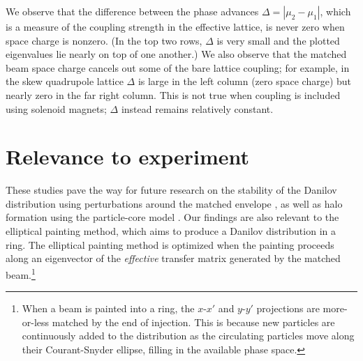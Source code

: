 %
We observe that the difference between the phase advances $\Delta = |\mu_2 - \mu_1|$, which is a measure of the coupling strength in the effective lattice, is never zero when space charge is nonzero. (In the top two rows, $\Delta$ is very small and the plotted eigenvalues lie nearly on top of one another.) We also observe that the matched beam space charge cancels out some of the bare lattice coupling; for example, in the skew quadrupole lattice $\Delta$ is large in the left column (zero space charge) but nearly zero in the far right column. This is not true when coupling is included using solenoid magnets; $\Delta$ instead remains relatively constant.  


\section{Relevance to experiment}

These studies pave the way for future research on the stability of the Danilov distribution using perturbations around the matched envelope \cite{Goswami2016}, as well as halo formation using the particle-core model \cite{Wangler1998, Gluckstern1994, Gluckstern1998}. Our findings are also relevant to the elliptical painting method, which aims to produce a Danilov distribution in a ring. The elliptical painting method is optimized when the painting proceeds along an eigenvector of the \textit{effective} transfer matrix generated by the matched beam.\footnote{When a beam is painted into a ring, the $x$-$x'$ and $y$-$y'$ projections are more-or-less matched by the end of injection. This is because new particles are continuously added to the distribution as the circulating particles move along their Courant-Snyder ellipse, filling in the available phase space.}
%

